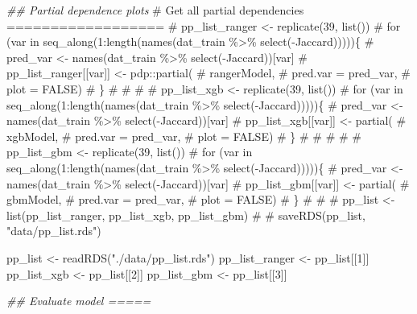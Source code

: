\documentclass[
  letterpaper,
  DIV=11,
  numbers=noendperiod]{scrartcl}
\newenvironment{Shaded}{\begin{snugshade}}{\end{snugshade}}
\newcommand{\CommentTok}[1]{\textcolor[rgb]{0.37,0.37,0.37}{#1}}
\newcommand{\DecValTok}[1]{\textcolor[rgb]{0.68,0.00,0.00}{#1}}
\newcommand{\DocumentationTok}[1]{\textcolor[rgb]{0.37,0.37,0.37}{\textit{#1}}}
\newcommand{\FunctionTok}[1]{\textcolor[rgb]{0.28,0.35,0.67}{#1}}
\newcommand{\NormalTok}[1]{\textcolor[rgb]{0.00,0.23,0.31}{#1}}
\newcommand{\OtherTok}[1]{\textcolor[rgb]{0.00,0.23,0.31}{#1}}
\newcommand{\StringTok}[1]{\textcolor[rgb]{0.13,0.47,0.30}{#1}}
\begin{document}
\begin{Shaded}
\begin{Highlighting}[]
\DocumentationTok{\#\# Partial dependence plots}
\CommentTok{\# Get all partial dependencies ==================}
\CommentTok{\# pp\_list\_ranger \textless{}{-} replicate(39, list())}
\CommentTok{\# for (var in seq\_along(1:length(names(dat\_train \%\textgreater{}\% select({-}Jaccard)))))\{}
\CommentTok{\#     pred\_var \textless{}{-} names(dat\_train \%\textgreater{}\% select({-}Jaccard))[var]}
\CommentTok{\#     pp\_list\_ranger[[var]] \textless{}{-} pdp::partial(}
\CommentTok{\#         rangerModel, }
\CommentTok{\#         pred.var = pred\_var, }
\CommentTok{\#         plot = FALSE)}
\CommentTok{\# \}}
\CommentTok{\# }
\CommentTok{\# }
\CommentTok{\# }
\CommentTok{\# pp\_list\_xgb \textless{}{-} replicate(39, list())}
\CommentTok{\# for (var in seq\_along(1:length(names(dat\_train \%\textgreater{}\% select({-}Jaccard)))))\{}
\CommentTok{\#     pred\_var \textless{}{-} names(dat\_train \%\textgreater{}\% select({-}Jaccard))[var]}
\CommentTok{\#     pp\_list\_xgb[[var]] \textless{}{-} partial(}
\CommentTok{\#         xgbModel, }
\CommentTok{\#         pred.var = pred\_var, }
\CommentTok{\#         plot = FALSE)}
\CommentTok{\# \}}
\CommentTok{\# }
\CommentTok{\# }
\CommentTok{\# }
\CommentTok{\# }
\CommentTok{\# pp\_list\_gbm \textless{}{-} replicate(39, list())}
\CommentTok{\# for (var in seq\_along(1:length(names(dat\_train \%\textgreater{}\% select({-}Jaccard)))))\{}
\CommentTok{\#     pred\_var \textless{}{-} names(dat\_train \%\textgreater{}\% select({-}Jaccard))[var]}
\CommentTok{\#     pp\_list\_gbm[[var]] \textless{}{-} partial(}
\CommentTok{\#         gbmModel, }
\CommentTok{\#         pred.var = pred\_var, }
\CommentTok{\#         plot = FALSE)}
\CommentTok{\# \}}
\CommentTok{\# }
\CommentTok{\# }
\CommentTok{\# pp\_list \textless{}{-} list(pp\_list\_ranger, pp\_list\_xgb, pp\_list\_gbm)}
\CommentTok{\#}
\CommentTok{\# saveRDS(pp\_list, "data/pp\_list.rds")}

\NormalTok{pp\_list }\OtherTok{\textless{}{-}} \FunctionTok{readRDS}\NormalTok{(}\StringTok{"./data/pp\_list.rds"}\NormalTok{)}
\NormalTok{pp\_list\_ranger }\OtherTok{\textless{}{-}}\NormalTok{ pp\_list[[}\DecValTok{1}\NormalTok{]]}
\NormalTok{pp\_list\_xgb }\OtherTok{\textless{}{-}}\NormalTok{ pp\_list[[}\DecValTok{2}\NormalTok{]]}
\NormalTok{pp\_list\_gbm }\OtherTok{\textless{}{-}}\NormalTok{ pp\_list[[}\DecValTok{3}\NormalTok{]]}


\DocumentationTok{\#\# Evaluate model =====}


\end{Highlighting}
\end{Shaded}
\end{document}
